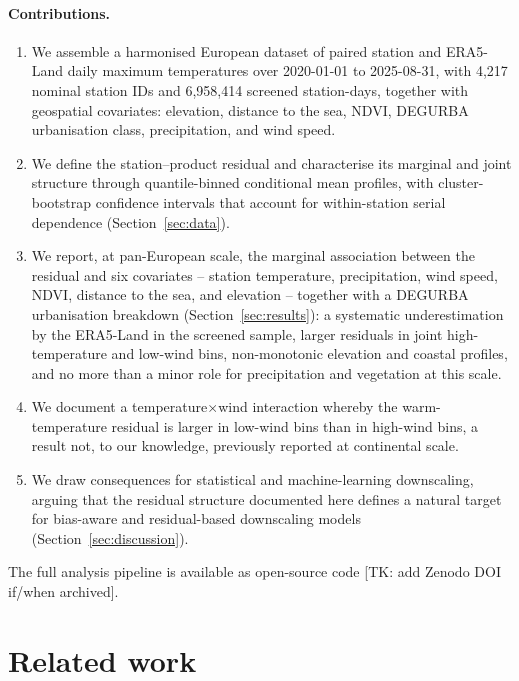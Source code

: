 \documentclass[a4paper,12pt,leqno]{article}
\begin{document}
\paragraph{Contributions.}
\begin{enumerate}
    \item We assemble a harmonised European dataset of paired station and
    ERA5-Land daily maximum temperatures over 2020-01-01 to 2025-08-31,
    with 4,217 nominal station IDs and 6,958,414 screened station-days, together with geospatial covariates:
    elevation, distance to the sea, NDVI, DEGURBA urbanisation class,
    precipitation, and wind speed.
    \item We define the station--product residual and characterise its
    marginal and joint structure through quantile-binned conditional
    mean profiles, with cluster-bootstrap confidence intervals that
    account for within-station serial dependence
    (Section~\ref{sec:data}).
    \item We report, at pan-European scale, the marginal association
    between the residual and six covariates -- station temperature,
    precipitation, wind speed, NDVI, distance to the sea, and elevation
    -- together with a DEGURBA urbanisation breakdown
    (Section~\ref{sec:results}): a systematic underestimation by the
    ERA5-Land in the screened sample, larger residuals in joint high-temperature
    and low-wind bins, non-monotonic elevation and coastal profiles, and no more than a minor role for
    precipitation and vegetation at this scale.
    \item We document a temperature$\times$wind interaction whereby the
    warm-temperature residual is larger in low-wind bins
    than in high-wind bins, a result not, to our knowledge,
    previously reported at continental scale.
    \item We draw consequences for statistical and machine-learning
    downscaling, arguing that the residual structure documented here
    defines a natural target for bias-aware and residual-based
    downscaling models (Section~\ref{sec:discussion}).
\end{enumerate}

The full analysis pipeline is available as open-source code
\cite{souilmi_era5_resid_github} [TK: add Zenodo DOI if/when archived].

\section{Related work}
\label{sec:related}
\end{document}
